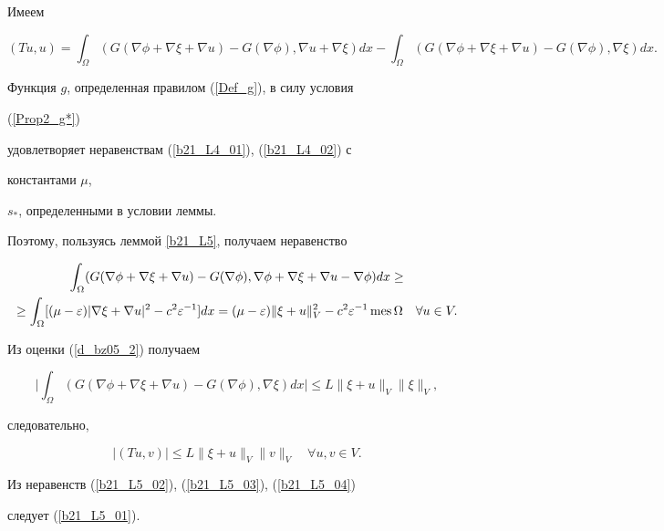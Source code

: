 \begin{pf}


Имеем


$$


(T u, u)=\int_{\Omega}


(G(\nabla \phi+\nabla \xi+\nabla u)-G(\nabla \phi),\nabla u+\nabla \xi) dx -


\int_{\Omega }(G(\nabla \phi +\nabla \xi+ \nabla u) -G(\nabla \phi)


,\nabla \xi)dx.


$$


Функция $g$, определенная правилом (\ref{Def_g}), в силу условия


(\ref{Prop2_g*})


удовлетворяет неравенствам (\ref{b21_L4_01}), (\ref{b21_L4_02}) с


константами $\mu$,


$s_*$, определенными в условии леммы.


Поэтому, пользуясь леммой \ref{b21_L5}, получаем неравенство


\begin{multline}


\int_{\Omega}(G(\nabla \phi +\nabla \xi+ \nabla u) -G(\nabla \phi),


\nabla \phi +\nabla \xi+ \nabla u- \nabla \phi)dx \geq\\


%


\geq \int_{\Omega }[ (\mu -\varepsilon)|\nabla \xi+ \nabla u|^2 -


c^2 \varepsilon ^{-1}]dx =


(\mu -\varepsilon)\|\xi + u \|_V^2- c^2 \varepsilon ^{-1}\mes\Omega


\quad \forall u \in V.


\label{b21_L5_02}


\end{multline}


Из оценки (\ref{d_bz05_2}) получаем


\begin{equation}\label{b21_L5_03}


\bigg|\int_{\Omega}


(G(\nabla \phi +\nabla \xi+ \nabla u) -G(\nabla \phi),


\nabla \xi)dx \bigg|\leq L\|\xi + u \|_V\|\xi \|_V,


\end{equation}


следовательно,


\begin{equation}


|({T u, v })|\leq L\|\xi + u \|_V\|v \|_V


\quad \forall u, v \in V.


\label{b21_L5_04}


\end{equation}


Из неравенств (\ref{b21_L5_02}), (\ref{b21_L5_03}), (\ref{b21_L5_04})


следует (\ref{b21_L5_01}).


\end{pf}





